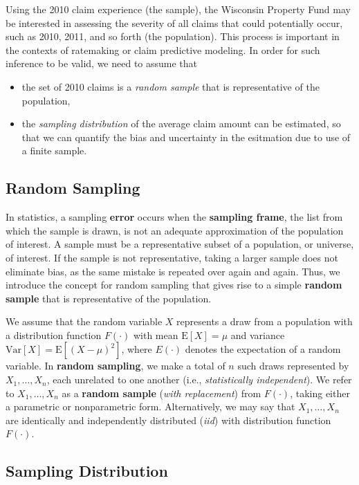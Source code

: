 \documentclass[]{book}
\providecommand{\tightlist}{%
  \setlength{\itemsep}{0pt}\setlength{\parskip}{0pt}}
\theoremstyle{definition}
\theoremstyle{definition}
\theoremstyle{definition}
\theoremstyle{remark}
\begin{document}
Using the 2010 claim experience (the sample), the Wisconsin Property
Fund may be interested in assessing the severity of all claims that
could potentially occur, such as 2010, 2011, and so forth (the
population). This process is important in the contexts of ratemaking or
claim predictive modeling. In order for such inference to be valid, we
need to assume that

\begin{itemize}
\tightlist
\item
  the set of 2010 claims is a \emph{random sample} that is
  representative of the population,
\item
  the \emph{sampling distribution} of the average claim amount can be
  estimated, so that we can quantify the bias and uncertainty in the
  esitmation due to use of a finite sample.
\end{itemize}

\subsection{Random Sampling}\label{random-sampling}

In statistics, a sampling \textbf{error} occurs when the
\textbf{sampling frame}, the list from which the sample is drawn, is not
an adequate approximation of the population of interest. A sample must
be a representative subset of a population, or universe, of interest. If
the sample is not representative, taking a larger sample does not
eliminate bias, as the same mistake is repeated over again and again.
Thus, we introduce the concept for random sampling that gives rise to a
simple \textbf{random sample} that is representative of the population.

We assume that the random variable \(X\) represents a draw from a
population with a distribution function \(F(\cdot)\) with mean
\(\mathrm{E}[X]=\mu\) and variance
\(\mathrm{Var}[X]=\mathrm{E}[(X-\mu)^2]\), where \(E(\cdot)\) denotes
the expectation of a random variable. In \textbf{random sampling}, we
make a total of \(n\) such draws represented by \(X_1, \ldots, X_n\),
each unrelated to one another (i.e., \emph{statistically independent}).
We refer to \(X_1, \ldots, X_n\) as a \textbf{random sample} (\emph{with
replacement}) from \(F(\cdot)\), taking either a parametric or
nonparametric form. Alternatively, we may say that \(X_1, \ldots, X_n\)
are identically and independently distributed (\emph{iid}) with
distribution function \(F(\cdot)\).

\subsection{Sampling Distribution}\label{sampling-distribution}
\end{document}
